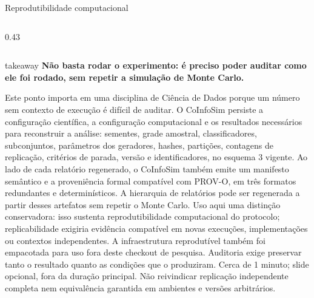 \begin{frame}{Reprodutibilidade computacional}
\begin{columns}[T,onlytextwidth]
\begin{column}{0.43\textwidth}
    \end{column}
  \end{columns}

  \vspace{.05cm}
  \begin{beamercolorbox}[wd=\linewidth,sep=.08cm,rounded=true]{takeaway}
    \centering\sffamily\bfseries\fontsize{9.4}{11.1}\selectfont
    Não basta rodar o experimento: é preciso poder auditar como ele foi rodado, sem repetir a simulação de Monte Carlo.
  \end{beamercolorbox}

  \speakernotes
    {Este ponto importa em uma disciplina de Ciência de Dados porque um número sem contexto de execução é difícil de auditar. O CoInfoSim persiste a configuração científica, a configuração computacional e os resultados necessários para reconstruir a análise: sementes, grade amostral, classificadores, subconjuntos, parâmetros dos geradores, hashes, partições, contagens de replicação, critérios de parada, versão e identificadores, no esquema 3 vigente. Ao lado de cada relatório regenerado, o CoInfoSim também emite um manifesto semântico e a proveniência formal compatível com PROV-O, em três formatos redundantes e determinísticos. A hierarquia de relatórios pode ser regenerada a partir desses artefatos sem repetir o Monte Carlo. Uso aqui uma distinção conservadora: isso sustenta reprodutibilidade computacional do protocolo; replicabilidade exigiria evidência compatível em novas execuções, implementações ou contextos independentes.}
    {A infraestrutura reprodutível também foi empacotada para uso fora deste checkout de pesquisa.}
    {Auditoria exige preservar tanto o resultado quanto as condições que o produziram.}
    {Cerca de 1 minuto; slide opcional, fora da duração principal.}
    {Não reivindicar replicação independente completa nem equivalência garantida em ambientes e versões arbitrários.}
\end{frame}

